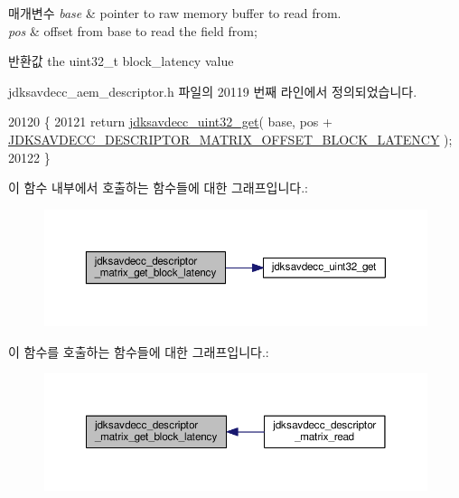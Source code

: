 \begin{DoxyParams}{매개변수}
{\em base} & pointer to raw memory buffer to read from. \\
\hline
{\em pos} & offset from base to read the field from; \\
\hline
\end{DoxyParams}
\begin{DoxyReturn}{반환값}
the uint32\+\_\+t block\+\_\+latency value 
\end{DoxyReturn}


jdksavdecc\+\_\+aem\+\_\+descriptor.\+h 파일의 20119 번째 라인에서 정의되었습니다.


\begin{DoxyCode}
20120 \{
20121     \textcolor{keywordflow}{return} \hyperlink{group__endian_gaefcf5bd4f368997a82f358ab89052d6b}{jdksavdecc\_uint32\_get}( base, pos + 
      \hyperlink{group__descriptor__matrix_gaf9f3c84e2827a0c14b447df99ef21905}{JDKSAVDECC\_DESCRIPTOR\_MATRIX\_OFFSET\_BLOCK\_LATENCY} );
20122 \}
\end{DoxyCode}


이 함수 내부에서 호출하는 함수들에 대한 그래프입니다.\+:
\nopagebreak
\begin{figure}[H]
\begin{center}
\leavevmode
\includegraphics[width=350pt]{group__descriptor__matrix_ga87ec4e64485477883f4d962511f39fe1_cgraph}
\end{center}
\end{figure}




이 함수를 호출하는 함수들에 대한 그래프입니다.\+:
\nopagebreak
\begin{figure}[H]
\begin{center}
\leavevmode
\includegraphics[width=350pt]{group__descriptor__matrix_ga87ec4e64485477883f4d962511f39fe1_icgraph}
\end{center}
\end{figure}


